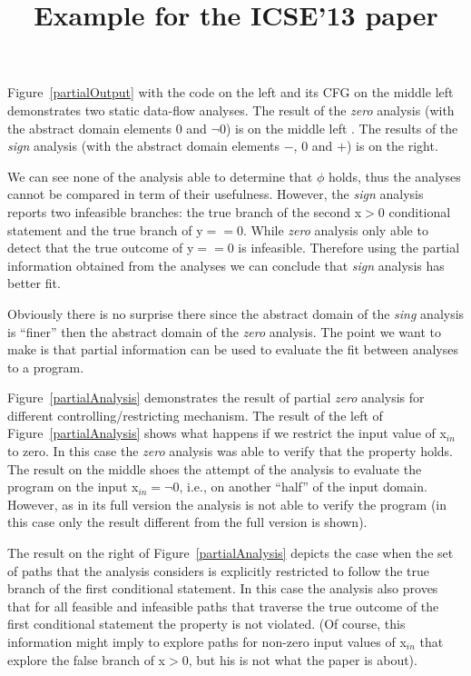 \documentclass{article}
\begin{document}
\title{Example for the ICSE'13 paper}
\maketitle

Figure~\ref{partialOutput} with the code on the left and its CFG on the middle left demonstrates two static data-flow analyses. The result of the {\em zero} analysis (with the abstract domain elements $0$ and $\neg 0$) is on the middle left . The results of the {\em sign} analysis (with the abstract domain elements $-$, $0$ and $+$) is on the right. 

We can see none of the analysis able to determine that $\phi$ holds, thus the analyses cannot be compared in term of their usefulness. However, the {\em sign} analysis reports two infeasible branches: the true branch of the second x$>$0 conditional statement and the true branch of y$==$0. While {\em zero} analysis only able to detect that the true outcome of y$==0$ is infeasible. Therefore using the partial information obtained from the analyses we can conclude that {\em sign} analysis has better fit. 

Obviously there is no surprise there since the abstract domain of the {\em sing} analysis is ``finer'' then the abstract domain of the {\em zero} analysis. The point we want to make  is that partial information can be used to evaluate the fit between analyses to a program.

Figure~\ref{partialAnalysis} demonstrates the result of partial {\em zero} analysis for different controlling/restricting mechanism. The result of the left of Figure~\ref{partialAnalysis} shows what happens if we restrict the input value of x$_{in}$ to zero. In this case the {\em zero} analysis was able to verify that the property holds. The result on the middle shoes the attempt of the analysis to evaluate the program on the input x$_{in}=\neg 0$, i.e., on another ``half'' of the input domain. However, as in its full version the analysis is not able to verify the program (in this case only the result different from the full version is shown). 

The result on the right of Figure~\ref{partialAnalysis} depicts the case when the set of paths that the analysis considers is explicitly restricted to follow the true branch of the first conditional statement. In this case the analysis also proves that for all feasible and infeasible paths that traverse the true outcome of the first conditional statement the property is not violated. (Of course, this information might imply to explore paths for non-zero input values of x$_{in}$ that explore the false branch of x$>$0, but his is not what the paper is about). 
\end{document}
